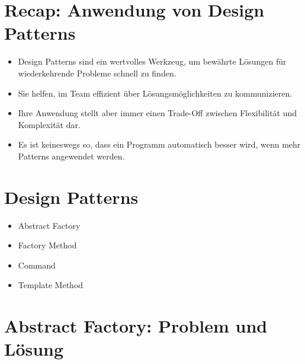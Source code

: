 \section*{Recap: Anwendung von Design Patterns}
\begin{itemize}
  \item Design Patterns sind ein wertvolles Werkzeug, um bewährte Lösungen für wiederkehrende Probleme schnell zu finden.
  \item Sie helfen, im Team effizient über Lösungsmöglichkeiten zu kommunizieren.
  \item Ihre Anwendung stellt aber immer einen Trade-Off zwischen Flexibilität und Komplexität dar.
  \item Es ist keineswegs so, dass ein Programm automatisch besser wird, wenn mehr Patterns angewendet werden.
\end{itemize}

\section*{Design Patterns}
\begin{itemize}
  \item Abstract Factory
  \item Factory Method
  \item Command
  \item Template Method
\end{itemize}

\section*{Abstract Factory: Problem und Lösung}
